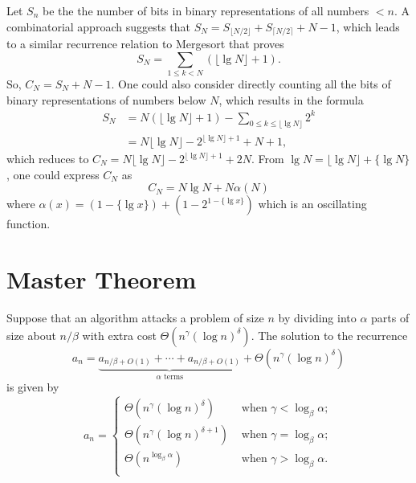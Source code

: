 \documentclass{article}
\begin{document}
Let $S_n$ be the the number of bits in binary representations of all numbers $<
n$. A combinatorial approach suggests that $S_N = S_{\lfloor N/2 \rfloor} +
S_{\lceil N/2 \rceil} + N - 1$, which leads to a similar recurrence relation to
Mergesort that proves \begin{equation*}
  S_N = \sum_{1 \leq k < N}(\lfloor \lg{N} \rfloor + 1).
\end{equation*} So, $C_N = S_N + N - 1$. One could also consider directly
counting all the bits of binary representations of numbers below $N$, which
results in the formula \begin{align*}
  S_N &= N(\lfloor \lg{N} \rfloor + 1) - \sum_{0 \leq k \leq \lfloor \lg{N}
    \rfloor} 2^k \\
    &= N\lfloor \lg{N} \rfloor - 2^{\lfloor \lg{N} \rfloor + 1} + N + 1,
\end{align*} which reduces to $C_N = N\lfloor \lg{N} \rfloor - 2^{\lfloor
\lg{N} \rfloor + 1} + 2N$. From $\lg{N} = \lfloor \lg{N} \rfloor + \{\lg{N}\}$,
one could express $C_N$ as \begin{equation*}
  C_N = N\lg{N} + N\alpha(N)
\end{equation*} where $\alpha(x) = (1 - \{\lg{x}\}) + (1 - 2^{1 -
\{\lg{x}\}})$ which is an oscillating function.

\section{Master Theorem}

Suppose that an algorithm attacks a problem of size $n$ by dividing into
$\alpha$ parts of size about $n/\beta$ with extra cost
$\Theta(n^{\gamma}(\log{n})^{\delta})$. The solution to the recurrence
\begin{equation}
  a_n = \underbrace{a_{n/\beta + O(1)} + \cdots + a_{n/\beta + O(1)}}_{\alpha
    \text{ terms}} + \Theta(n^{\gamma}(\log{n})^{\delta})
\end{equation} is given by \begin{equation}
  a_n = \begin{cases}
    \Theta(n^{\gamma}(\log{n})^{\delta}) &\text{ when } \gamma <
      \log_{\beta}{\alpha}; \\
    \Theta(n^{\gamma}(\log{n})^{\delta + 1}) &\text{ when } \gamma =
      \log_{\beta}{\alpha}; \\
    \Theta(n^{\log_{\beta}{\alpha}}) &\text{ when } \gamma >
      \log_{\beta}{\alpha}. \\
  \end{cases}
\end{equation}
\end{document}
